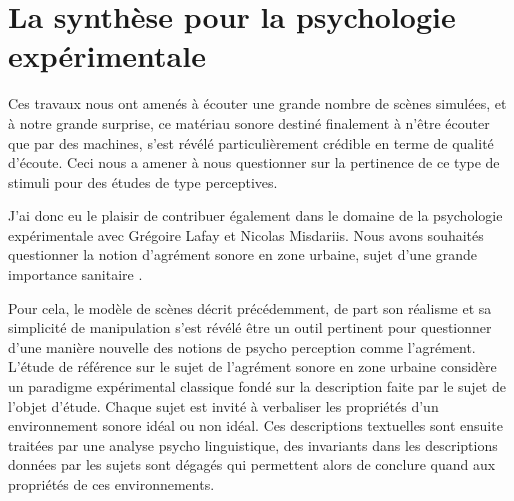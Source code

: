 \section{La synthèse pour la psychologie expérimentale} \label{sec:psycho}

Ces travaux nous ont amenés à écouter une grande nombre de scènes simulées, et à notre grande surprise, ce matériau sonore destiné finalement à n'être écouter que par des machines, s'est révélé particulièrement crédible en terme de qualité d'écoute. Ceci nous a amener à nous questionner sur la pertinence de ce type de stimuli pour des études de type perceptives.

J'ai donc eu le plaisir de contribuer également dans le domaine de la psychologie expérimentale avec Grégoire Lafay et Nicolas Misdariis. Nous avons souhaités questionner la notion d'agrément sonore en zone urbaine, sujet d'une grande importance sanitaire \cite{europe}.

Pour cela, le modèle de scènes décrit précédemment, de part son réalisme et sa simplicité de manipulation s'est révélé être un outil pertinent pour questionner d'une manière nouvelle des notions de psycho perception comme l'agrément. L'étude de référence sur le sujet de l'agrément sonore en zone urbaine \cite{guastavino} considère un paradigme expérimental classique fondé sur la description faite par le sujet de l'objet d'étude. Chaque sujet est invité à verbaliser les propriétés d'un environnement sonore idéal ou non idéal. Ces descriptions textuelles sont ensuite traitées par une analyse psycho linguistique, des invariants dans les descriptions données par les sujets sont dégagés qui permettent alors de conclure quand aux propriétés de ces environnements.

